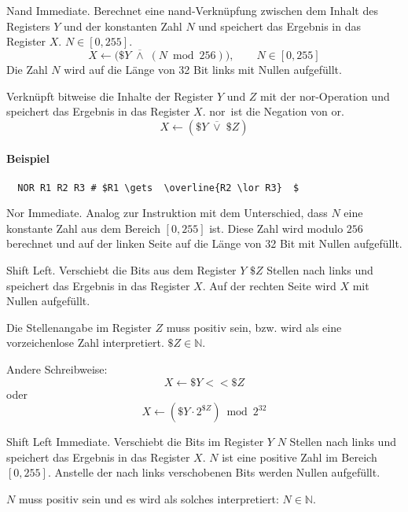 \glqq Nand Immediate\grqq.
Berechnet eine nand-Verknüpfung zwischen dem Inhalt des Registers $Y$ und der
konstanten Zahl $N$ und speichert das Ergebnis in das Register $X$.
$N \in [0, 255]$.
\[
    X \gets \big(\$Y \; \overline{\land} \; (N \bmod 256) \big),
    \qquad N \in [0, 255]
\]
Die Zahl $N$ wird auf die Länge von 32 Bit links mit Nullen aufgefüllt.


Verknüpft bitweise die Inhalte der Register $Y$ und $Z$ mit der nor-Operation
und speichert das Ergebnis in das Register $X$. \glqq nor\grqq\ ist die Negation
von \glqq or\grqq.
\[
    X \gets (\$Y \; \overline{\lor} \; \$Z)
\]

\paragraph{Beispiel}
\begin{lstlisting}
  NOR R1 R2 R3 # $R1 \gets  \overline{R2 \lor R3}  $
\end{lstlisting}


\glqq Nor Immediate\grqq.
Analog zur Instruktion  mit dem Unterschied, dass $N$ eine konstante
Zahl aus dem Bereich $[0, 255]$ ist. Diese Zahl wird modulo $256$ berechnet und
auf der linken Seite auf die Länge von 32 Bit mit Nullen aufgefüllt.



\glqq Shift Left\grqq.
Verschiebt die Bits aus dem Register $Y$ $\$Z$ Stellen nach links und speichert
das Ergebnis in das Register $X$. Auf der rechten Seite wird $X$ mit Nullen
aufgefüllt.

Die Stellenangabe im Register $Z$ muss positiv sein, bzw. wird als eine
vorzeichenlose Zahl interpretiert. $\$Z \in \mathds{N}$.

Andere Schreibweise:
\[
    X \gets \$Y << \$Z
\]
oder 
\[
    X \gets 
    ( \$Y \cdot 2^{\$Z}  ) \bmod 2^{32}
\]



\glqq Shift Left Immediate\grqq.
Verschiebt die Bits im Register $Y$ $N$ Stellen nach links und speichert das
Ergebnis in das Register $X$.
$N$ ist eine positive Zahl im Bereich $[0, 255]$.
Anstelle der nach links verschobenen Bits werden Nullen aufgefüllt.

$N$ muss positiv sein und es wird als solches interpretiert: $N \in \mathds{N}$.



